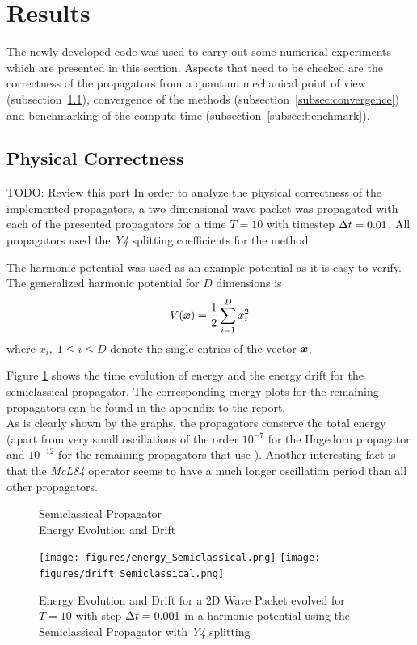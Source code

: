 \section{Results}
\label{sec:results}
%
The newly developed code was used to carry out some numerical experiments which are presented in this section.
Aspects that need to be checked are the correctness of the propagators from a quantum mechanical point of view (subsection~\ref{subsec:physical}), convergence of the methods (subsection~\ref{subsec:convergence}) and benchmarking of the compute time (subsection~\ref{subsec:benchmark}).

\subsection{Physical Correctness}
\label{subsec:physical}
{\Huge TODO: Review this part}
%
In order to analyze the physical correctness of the implemented propagators, a two dimensional wave packet was propagated with each of the presented propagators for a time $T = 10$ with timestep $\Delta t = 0.01$.
All propagators used the \emph{Y4} splitting coefficients for the  method.
\par\medskip
%
The harmonic potential was used as an example potential as it is easy to verify.
The generalized harmonic potential for $D$ dimensions is
\begin{align}
	V(\bm{x}) = 
	\frac{1}{2} \sum_{i=1}^D x_i^2
\end{align}
%
where $x_i, \; 1 \le i \le D$ denote the single entries of the vector $\bm{x}$.
\par\medskip
%
Figure \ref{fig:energy_Semiclassical} shows the time evolution of energy and the energy drift for the semiclassical propagator. The corresponding energy plots for the remaining propagators can be found in the appendix to the report. \\
As is clearly shown by the graphs, the propagators conserve the total energy (apart from very small oscillations of the order $10^{-7}$ for the Hagedorn propagator and $10^{-12}$ for the remaining propagators that use ).
Another interesting fact is that the \emph{McL84} operator seems to have a much longer oscillation period than all other propagators.
%
\begin{figure}[ht]
	\centering
	\begin{minipage}[c]{\textwidth}
		\begin{center}
			\large Semiclassical Propagator \\[1mm]
			\normalsize Energy Evolution and Drift
			\vspace{4mm}
		\end{center}
	\end{minipage}
	\texttt{[image: figures/energy\_Semiclassical.png]}
	\texttt{[image: figures/drift\_Semiclassical.png]}
	\caption{Energy Evolution and Drift for a 2D Wave Packet evolved for $T = 10$ with step $\Delta t = 0.001$ in a harmonic potential using the Semiclassical Propagator with \emph{Y4} splitting}
	\label{fig:energy_Semiclassical}
\end{figure}


